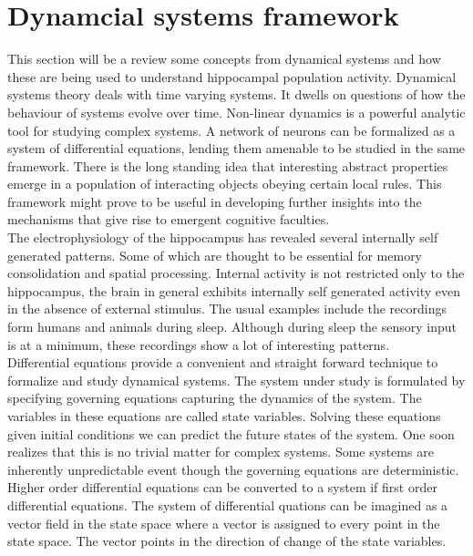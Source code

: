 
\section{Dynamcial systems framework}
\label{dynamics}



This section will be a review some concepts from dynamical systems and how these are being used to understand hippocampal population activity. Dynamical systems theory deals with time varying systems. It dwells on questions of how the behaviour of systems evolve over time. Non-linear dynamics is a powerful analytic tool for studying complex systems. A network of neurons can be formalized as a system of differential equations, lending them amenable to be studied in the same framework. There is the long standing idea that interesting abstract properties emerge in a population of interacting objects obeying certain local rules. This framework might prove to be useful in developing further insights into the mechanisms that give rise to emergent cognitive faculties.\\
The electrophysiology of the hippocampus has revealed several internally self generated patterns. Some of which are thought to be essential for memory consolidation and spatial processing. Internal activity is not restricted only to the hippocampus, the brain in general exhibits internally self generated activity even in the absence of external stimulus. The usual examples include the recordings form humans and animals during sleep. Although during sleep the sensory input is at a minimum, these recordings show a lot of interesting patterns.\\
Differential equations provide a convenient and straight forward technique to formalize and study dynamical systems. The system under study is formulated by specifying governing equations capturing the dynamics of the system. The variables in these equations are called state variables. Solving these equations given initial conditions we can predict the future states of the system. One soon realizes that this is no trivial matter for complex systems. Some systems are inherently unpredictable event though the governing equations are deterministic. Higher order differential equations can be converted to a system if first order differential equations. The system of differential quations can be imagined as a vector field in the state space where a vector is assigned to every point in the state space. The vector points in the direction of change of the state variables. 
 
